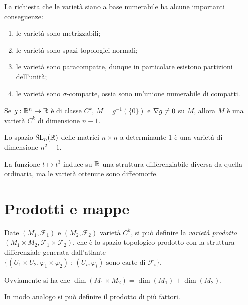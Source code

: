  \begin{remark}
  La richiesta che le varietà siano a base numerabile ha alcune importanti conseguenze:
  \begin{enumerate}
   \item le varietà sono metrizzabili;
   \item le varietà sono spazi topologici normali;
   \item le varietà sono paracompatte, dunque in particolare esistono partizioni dell'unità;
   \item le varietà sono $\sigma$-compatte, ossia sono un'unione numerabile di compatti.
  \end{enumerate}
 \end{remark}

\begin{exercise}
	Se $g:\mathbb R^n\to\mathbb R$ è di classe $C^k$, $M=g^{-1}(\{0\})$ e $\nabla g\ne 0$ su $M$, allora $M$ è una varietà $C^k$ di dimensione $n-1$.
\end{exercise}
\begin{exercise}
	Lo spazio $\mathrm{SL}_n(\mathbb R)$ delle matrici $n\times n$ a determinante 1 è una varietà di dimensione $n^2-1$.
\end{exercise}
\begin{exercise}
	La funzione $t\mapsto t^3$ induce su $\mathbb R$ una struttura differenziabile diversa da quella ordinaria, ma le varietà ottenute sono diffeomorfe.
\end{exercise}
 
 \section{Prodotti e mappe}
 
\begin{definition} 
	Date $(M_1,\mathcal F_1)$ e $(M_2,\mathcal F_2)$ varietà $C^k$, si può definire la \emph{varietà prodotto} $(M_1\times M_2,\mathcal F_1\times\mathcal F_2)$, che è lo spazio topologico prodotto con la struttura differenziale generata dall'atlante $\{(U_1\times U_2,\varphi_1\times\varphi_2)\ :\ \text{$(U_i,\varphi_i)$ sono carte di $\mathcal F_i$}\}$.
\end{definition}

\begin{remark}
	Ovviamente si ha che $\dim(M_1\times M_2)=\dim(M_1)+\dim(M_2)$.
\end{remark}

In modo analogo si può definire il prodotto di più fattori.
 
